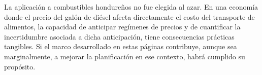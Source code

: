 La aplicación a combustibles hondureños no fue elegida al azar.  En
una economía donde el precio del galón de diésel afecta directamente
el costo del transporte de alimentos, la capacidad de anticipar
regímenes de precios y de cuantificar la incertidumbre asociada
a dicha anticipación, tiene consecuencias prácticas tangibles.  Si
el marco desarrollado en estas páginas contribuye, aunque sea
marginalmente, a mejorar la planificación en ese contexto, habrá
cumplido su propósito.








